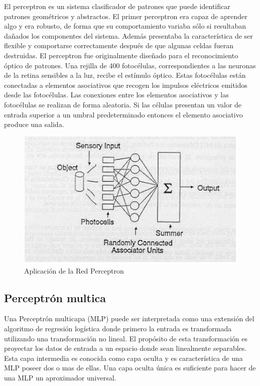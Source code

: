 \vspace{1\baselineskip}
El perceptron es un sistema clasificador de patrones que puede identificar patrones geométricos y abstractos. El primer perceptron era capaz de aprender algo y era robusto, de forma que su comportamiento variaba sólo si resultaban dañados los componentes del sistema.
Además presentaba la característica de ser flexible y comportarse correctamente después de que algunas celdas fueran destruidas.
El perceptron fue originalmente diseñado para el reconocimiento óptico de patrones. Una rejilla de 400 fotocélulas, correspondientes a las neuronas de la retina sensibles a la luz, recibe el estímulo óptico. Estas fotocélulas están conectadas a elementos asociativos que recogen los impulsos eléctricos emitidos desde las fotocélulas. Las
conexiones entre los elementos asociativos y las fotocélulas se realizan de forma aleatoria.
Si las células presentan un valor de entrada superior a un umbral predeterminado entonces el elemento asociativo produce una salida\cite{olabe1998redes}.

\begin{figure}[H]
  \begin{center}
    \includegraphics[scale=0.90]{./perceptron.png}
    \caption{Aplicación de la Red Perceptron}
    \label{fig:perceptron}
  \end{center}
\end{figure}

\subsection{Perceptrón multica}
Una Perceptrón multicapa (MLP) puede ser interpretada como una extensión del algoritmo de regresión logística donde primero la entrada es transformada utilizando una transformación no lineal\cite{de2014aprendizaje}. El propósito de esta transformación es proyectar los datos de entrada a un espacio donde sean linealmente separables. Esta capa intermedia es conocida como capa oculta y es característica de una MLP poseer dos o mas de ellas. Una capa oculta única es suficiente para hacer de una MLP un aproximador universal.

